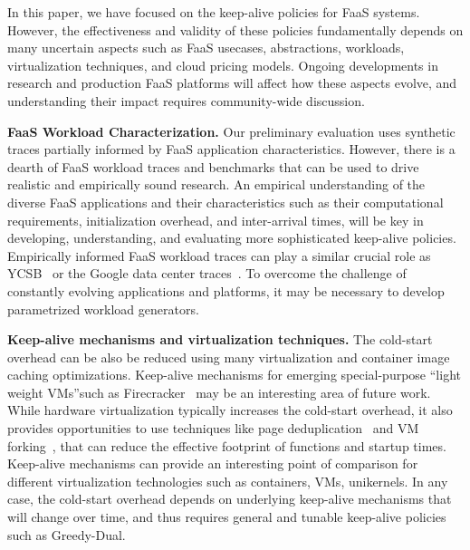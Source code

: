 
In this paper, we have focused on the keep-alive policies for FaaS systems.
%
However, the effectiveness and validity of these policies fundamentally depends on many uncertain aspects such as  FaaS usecases, abstractions, workloads, virtualization techniques, and cloud pricing models. 
%
Ongoing developments in research and production FaaS platforms will affect how these aspects evolve, and understanding their impact requires community-wide discussion. 



\noindent \textbf{FaaS Workload Characterization.}
Our preliminary evaluation uses synthetic traces partially informed by FaaS application characteristics. 
However, there is a dearth of FaaS workload traces and benchmarks that can be used to drive realistic and empirically sound research. 
An empirical understanding of the diverse FaaS applications and their characteristics such as their computational requirements, initialization overhead, and inter-arrival times, will be key in developing, understanding, and evaluating more sophisticated keep-alive policies. 
Empirically informed FaaS workload traces can play a similar crucial role as YCSB~\cite{ycsb-socc2010} or the Google data center traces~\cite{clusterdata:Reiss2011}. 
To overcome the challenge of constantly evolving applications and platforms, it may be necessary to develop parametrized workload generators. 



\noindent \textbf{Keep-alive mechanisms and virtualization techniques.}
The cold-start overhead can be also be reduced using  many virtualization and container image caching optimizations. 
Keep-alive mechanisms for emerging special-purpose ``light weight VMs''such as Firecracker~\cite{firecracker-nsdi20} may be an interesting area of future work. 
While hardware virtualization typically increases the cold-start overhead, it also provides opportunities to use techniques like page deduplication~\cite{sharma2012singleton} and VM forking~\cite{lagar2011snowflock}, that can reduce the effective footprint of functions and startup times.
Keep-alive mechanisms can provide an interesting point of comparison for different virtualization technologies such as containers, VMs, unikernels.
In any case, the cold-start overhead depends on underlying keep-alive mechanisms that will change over time, and thus requires general and tunable keep-alive policies such as Greedy-Dual. 




